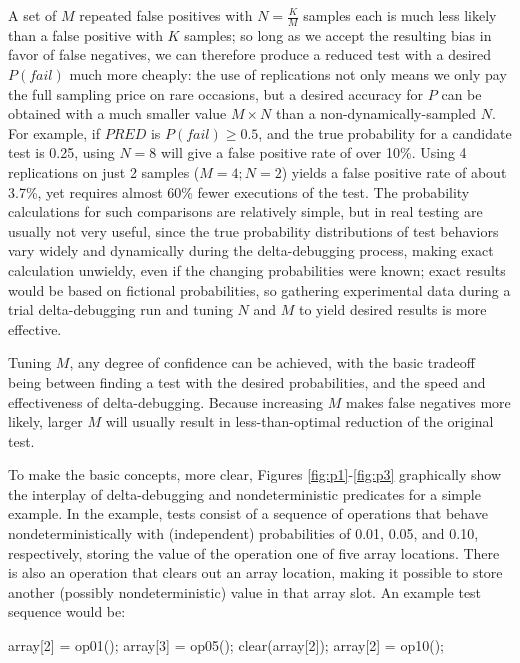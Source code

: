 A set of $M$ repeated false positives with
$N = \frac{K}{M}$ samples each is much less likely than a false positive
with $K$ samples; so long as we accept the resulting bias in favor of
false negatives, we can therefore produce a reduced test with a
desired $P(fail)$ much more cheaply:  the use of replications not only
means we only pay the full sampling price on rare occasions, but a
desired accuracy for $P$ can be obtained with a much smaller value $M
\times N$ than a non-dynamically-sampled $N$.  For example, if $\mathit{PRED}$
is $P(fail) \geq 0.5$, and the true probability for a candidate test
is 0.25, using $N=8$ will give a false positive rate of over 10\%.
Using 4 replications on just 2 samples ($M=4;N=2$) yields a false
positive rate of about 3.7\%, yet requires almost 60\% fewer
executions of the test.  The probability calculations for such comparisons
  are relatively simple, but in real testing are
  usually not very useful, since the true
  probability distributions of test behaviors vary widely and
  dynamically during the
  delta-debugging process, making exact calculation unwieldy, even if
  the changing probabilities were known; exact results would be based on fictional
  probabilities, so gathering experimental data during a trial
  delta-debugging run and tuning $N$ and $M$ to yield desired
  results is  more effective.

Tuning $M$, any degree of confidence can be achieved, with
the basic tradeoff being between finding a test with the desired
probabilities, and the speed and effectiveness of delta-debugging.
Because increasing $M$ makes false negatives more likely, larger $M$
will usually result in less-than-optimal reduction of the original
test.

To make the basic concepts, more clear, Figures
\ref{fig:p1}-\ref{fig:p3} graphically show the interplay of
delta-debugging and nondeterministic predicates for a simple example.
In the example, tests consist of a sequence of operations that behave
nondeterministically with (independent) probabilities of 0.01, 0.05,
and 0.10, respectively, storing the value of the operation one of five array locations.
There is also an operation that clears out an array location, making
it possible to store another (possibly nondeterministic) value in that
array slot.  An example test sequence would be:

{\scriptsize
\begin{code}
array[2] = op01();
array[3] = op05();
clear(array[2]);
array[2] = op10();
\end{code}
}

